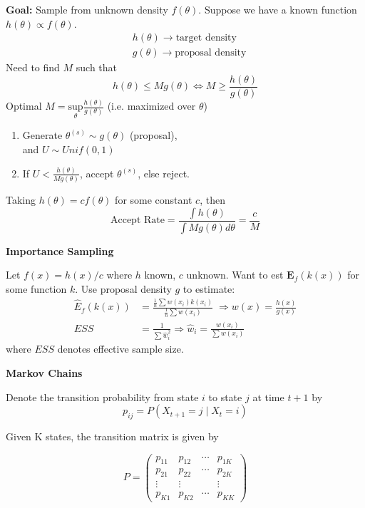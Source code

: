 \documentclass[a4paper]{article}
\newcommand{\subheading}[1]{{\scriptsize\textbf{#1}}}
\begin{document}
\begin{multicols*}{4}
\textbf{Goal:} Sample from unknown density $f(\theta)$. Suppose we have a known function $h(\theta) \propto f(\theta)$.
$$
\begin{aligned}
&h(\theta) \rightarrow \text{target density} \\
&g(\theta) \rightarrow \text{proposal density}
\end{aligned}
$$
Need to find $M$ such that 
$$
h(\theta) \leq Mg(\theta) \iff M \geq \frac{h(\theta)}{g(\theta)}
$$
Optimal $M = \underset{\theta}{\text{sup}} \frac{h(\theta)}{g(\theta)}$ (i.e. maximized over $\theta$)
\begin{enumerate}
    \item Generate $\theta^{(s)} \sim g(\theta) $ (proposal), \\ and $U \sim Unif(0,1)$
    \item If $U < \frac{h(\theta)}{Mg(\theta)}$, accept $\theta^{(s)}$, else reject.
\end{enumerate}
Taking $h(\theta)= cf(\theta)$ for some constant $c$, then
$$
\text{Accept Rate} = \frac{\int h(\theta)}{\int M g(\theta) d\theta} = \frac{c}{M}
$$

\subheading{Importance Sampling}

Let $f(x)=h(x)/c$ where $h$ known, $c$ unknown. Want to est $\mathbf{E}_f(k(x))$ for some function $k$. Use proposal density $g$ to estimate:
$$
\begin{aligned}
\hat E_f(k(x))&=\frac{\frac1n \sum w(x_i) k(x_i) }{\frac1n \sum w(x_i)} \; \Rightarrow w(x) = \frac{h(x)}{g(x)} \\
ESS&=\frac1{\sum \hat w_i^2} \Rightarrow  \hat w_i = \frac{w(x_i)}{\sum w(x_i)}
\end{aligned}
$$
where $ESS$ denotes effective sample size.

\smallskip
\hline
\smallskip

\subheading{Markov Chains}

Denote the transition probability from state $i$ to state $j$ at time $t+1$ by 
$$
p_{i j}=P\left(X_{t+1}=j \mid X_t=i\right)
$$
   
Given K states, the transition matrix is given by

$$
P=\left(\begin{array}{cccc}
p_{11} & p_{12} & \cdots & p_{1 K} \\
p_{21} & p_{22} & \cdots & p_{2 K} \\
\vdots & \vdots & & \vdots \\
p_{K 1} & p_{K 2} & \cdots & p_{K K}
\end{array}\right)
$$


\end{multicols*}
\end{document}
